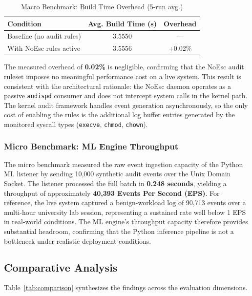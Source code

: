 \documentclass[journal]{./IEEEtran}
\begin{document}
\begin{table}[H]
    \centering
    \footnotesize
    \setlength{\tabcolsep}{4pt}
    \renewcommand{\arraystretch}{1.1}
    \caption{Macro Benchmark: Build Time Overhead (5-run avg.)}
    \begin{tabular}{|l|c|c|}
        \hline
        \textbf{Condition} & \textbf{Avg. Build Time (s)} & \textbf{Overhead} \\ \hline
        Baseline (no audit rules) & 3.5550 & --- \\ \hline
        With NoEsc rules active   & 3.5556 & +0.02\% \\ \hline
    \end{tabular}
    \label{tab:macro_bench}
\end{table}

The measured overhead of \textbf{0.02\%} is negligible, confirming that the NoEsc audit ruleset imposes no meaningful performance cost on a live system. This result is consistent with the architectural rationale: the NoEsc daemon operates as a passive \texttt{audispd} consumer and does not intercept system calls in the kernel path. The kernel audit framework handles event generation asynchronously, so the only cost of enabling the rules is the additional log buffer entries generated by the monitored syscall types (\texttt{execve}, \texttt{chmod}, \texttt{chown}).

\subsubsection{Micro Benchmark: ML Engine Throughput}
The micro benchmark measured the raw event ingestion capacity of the Python ML listener by sending 10,000 synthetic audit events over the Unix Domain Socket. The listener processed the full batch in \textbf{0.248 seconds}, yielding a throughput of approximately \textbf{40,393 Events Per Second (EPS)}. For reference, the live system captured a benign-workload log of 90,713 events over a multi-hour university lab session, representing a sustained rate well below 1 EPS in real-world conditions. The ML engine's throughput capacity therefore provides substantial headroom, confirming that the Python inference pipeline is not a bottleneck under realistic deployment conditions.

\subsection{Comparative Analysis}


Table~\ref{tab:comparison} synthesizes the findings across the evaluation dimensions.
\end{document}
